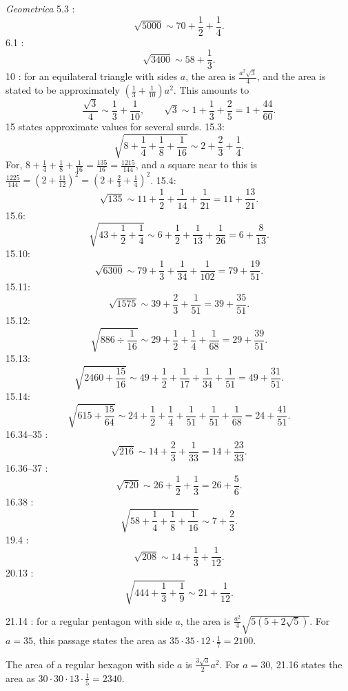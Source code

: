 \documentclass{amsart}
\theoremstyle{definition}
\begin{document}
{\em Geometrica} 5.3 \cite[p.~203]{heronisIV}: 
\[
\sqrt{5000} \sim 70 + \frac{1}{2}+\frac{1}{4}.
\]
6.1 \cite[p.~209]{heronisIV}:
\[
\sqrt{3400} \sim 58 + \frac{1}{3}.
\]
10 \cite[p.~223]{heronisIV}: for an equilateral triangle with sides $a$, the area
is $\frac{a^2 \sqrt{3}}{4}$, and the area is stated to be
approximately $\left(\frac{1}{3} + \frac{1}{10} \right)a^2$. This amounts to
\[
\frac{\sqrt{3}}{4} \sim \frac{1}{3}+\frac{1}{10},\qquad
\sqrt{3} \sim 1+\frac{1}{3}+\frac{2}{5} = 1+\frac{44}{60}.
\]
15 \cite[pp.~286--301]{heronisIV} states approximate values for several surds.
15.3:\[
\sqrt{8+\frac{1}{4}+\frac{1}{8}+\frac{1}{16}} \sim
2+\frac{2}{3}+\frac{1}{4}.
\]
For,
$8+\frac{1}{4}+\frac{1}{8}+\frac{1}{16}=\frac{135}{16}=\frac{1215}{144}$, and a square near to this is
$\frac{1225}{144}=\left(2+\frac{11}{12}\right)^2=\left(2+\frac{2}{3}+\frac{1}{4}\right)^2$. 
15.4:
\[
\sqrt{135} \sim 11+\frac{1}{2}+\frac{1}{14}+\frac{1}{21}=11+\frac{13}{21}.
\]
15.6: 
\[
\sqrt{43+\frac{1}{2}+\frac{1}{4}} \sim 6+\frac{1}{2}+\frac{1}{13}+\frac{1}{26}=6+\frac{8}{13}.
\]
15.10:
\[
\sqrt{6300} \sim 79+\frac{1}{3}+\frac{1}{34}+\frac{1}{102} = 79+\frac{19}{51}.
\]
15.11:
\[
\sqrt{1575} \sim 39 + \frac{2}{3}+\frac{1}{51}= 39+\frac{35}{51}.
\]
15.12:
\[
\sqrt{886 \div \frac{1}{16}} \sim 29+\frac{1}{2}+\frac{1}{4}+\frac{1}{68} = 29 + \frac{39}{51}.
\]
15.13:
\[
\sqrt{2460+\frac{15}{16}} \sim 49 + \frac{1}{2}+\frac{1}{17}+\frac{1}{34}+\frac{1}{51} = 49 + \frac{31}{51}.
\]
15.14:
\[
\sqrt{615+\frac{15}{64}} \sim 24+ \frac{1}{2}+\frac{1}{4}+\frac{1}{51}+\frac{1}{51}+\frac{1}{68} = 24+\frac{41}{51}.
\]
16.34--35 \cite[p.~323]{heronisIV}:
\[
\sqrt{216} \sim 14+\frac{2}{3}+\frac{1}{33} = 14+\frac{23}{33}.
\]
16.36--37 \cite[p.~325]{heronisIV}:
\[
\sqrt{720} \sim 26+\frac{1}{2}+\frac{1}{3} = 26+\frac{5}{6}.
\]
16.38 \cite[p.~327]{heronisIV}:
\[
\sqrt{58+\frac{1}{4}+\frac{1}{8}+\frac{1}{16}} \sim 7 +\frac{2}{3}.
\]
19.4 \cite[p.~359]{heronisIV}:
\[
\sqrt{208} \sim 14 + \frac{1}{3}+\frac{1}{12}.
\]
20.13 \cite[p.~373]{heronisIV}:
\[
\sqrt{444+\frac{1}{3}+\frac{1}{9}} \sim 21 + \frac{1}{12}.
\]

21.14 \cite[p.~383]{heronisIV}: for a regular pentagon with side $a$, the area is
$\frac{a^2}{4}\sqrt{5(5+2\sqrt{5})}$. For $a=35$, 
this passage states the area as $35 \cdot 35 \cdot 12 \cdot \frac{1}{7} = 2100$.

The area of a regular hexagon with side $a$ is $\frac{3\sqrt{3}}{2}a^2$. For $a=30$, 
21.16 states the area as $30 \cdot 30 \cdot 13 \cdot \frac{1}{5} = 2340$. 
\end{document}

